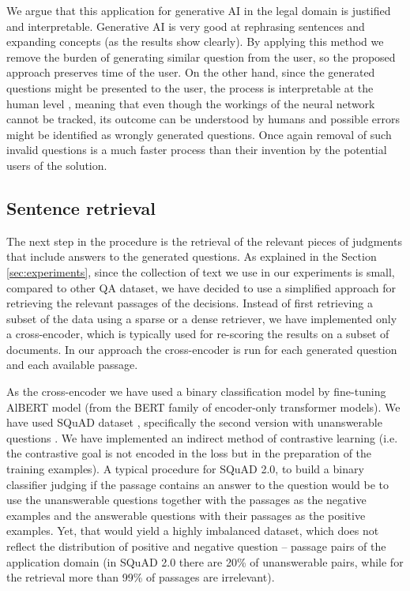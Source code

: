 We argue that this application for generative AI in the legal domain is justified and interpretable. 
Generative AI is very good at rephrasing sentences and expanding concepts (as the results show clearly). 
By applying this method we remove the burden of generating similar question from the user, 
so the proposed approach preserves time of the user. On the other hand, since the generated questions 
might be presented to the user, the process is interpretable at the human level \cite{martinez2023survey}, meaning that
even though the workings of the neural network cannot be tracked, its outcome can be understood by humans and 
possible errors might be identified as wrongly generated questions. Once again removal of such invalid questions 
is a much faster process than their invention by the potential users of the solution.

\subsection{Sentence retrieval}

The next step in the procedure is the retrieval of the relevant pieces of judgments that include answers to the
generated questions. As explained in the Section \ref{sec:experiments}, since the collection of text we use in our experiments
is small, compared to other QA dataset, we have decided to use a simplified approach for retrieving the relevant
passages of the decisions. Instead of first retrieving a subset of the data using a sparse or a dense retriever,
we have implemented only a cross-encoder, which is typically used for re-scoring the results on a subset of documents.
In our approach the cross-encoder is run for each generated question and each available passage. 

As the cross-encoder we have used a binary classification model by fine-tuning AlBERT \cite{lan2019albert} model (from the BERT family
\cite{devlin2018bert} of encoder-only transformer models). We have used SQuAD dataset \cite{rajpurkar2016squad},
specifically the second version with unanswerable questions \cite{rajpurkar2018know}. We have implemented
an indirect method of contrastive learning (i.e. the contrastive goal is not encoded in the loss but in the preparation of
the  training examples). A typical procedure for SQuAD 2.0, to build a binary classifier judging if the passage 
contains an answer to the question would be to use the unanswerable questions together with the passages as the 
negative examples and the answerable questions with their passages as the positive examples. Yet, that would yield
a highly imbalanced dataset, which does not reflect the distribution of positive and negative question -- passage 
pairs of the application domain (in SQuAD 2.0 there are 20\% of unanswerable pairs, while 
for the retrieval more than 99\% of passages are irrelevant). 


